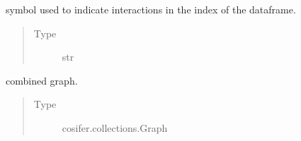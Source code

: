 \documentclass[letterpaper,10pt,english]{sphinxmanual}
\begin{document}
\begin{fulllineitems}
\begin{fulllineitems}
\end{fulllineitems}


\begin{fulllineitems}
\label{\detokenize{_modules/cosifer.combiners:cosifer.combiners.cit.CombineInteractionTables.interaction_symbol}}
symbol used to indicate
interactions in the index of the dataframe.
\begin{quote}\begin{description}
\item[{Type}] \leavevmode
str

\end{description}\end{quote}

\end{fulllineitems}


\begin{fulllineitems}
\label{\detokenize{_modules/cosifer.combiners:cosifer.combiners.cit.CombineInteractionTables.graph}}
combined graph.
\begin{quote}\begin{description}
\item[{Type}] \leavevmode
cosifer.collections.Graph

\end{description}\end{quote}

\end{fulllineitems}


\end{fulllineitems}

\end{document}
